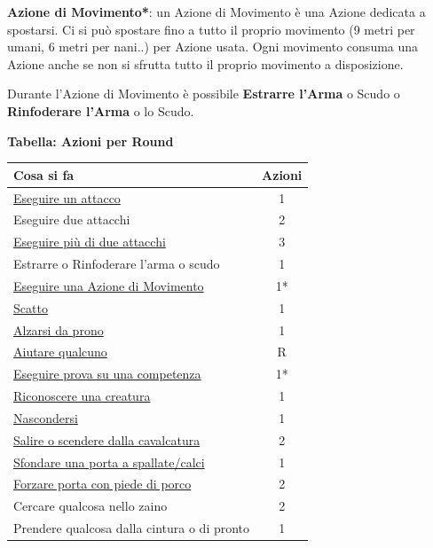 \begin{multicols}{2}
\textbf{Azione di Movimento*}: un Azione di Movimento è una Azione dedicata a spostarsi. Ci si può spostare fino a tutto il proprio movimento (9 metri per umani, 6 metri per nani..) per Azione usata. Ogni movimento consuma una Azione anche se non si sfrutta tutto il proprio movimento a disposizione.

Durante l'Azione di Movimento è possibile \textbf{Estrarre l'Arma} o Scudo o \textbf{Rinfoderare l'Arma} o lo Scudo.

\medskip

\textbf{Tabella: Azioni per Round}

\medskip

\noindent\begin{tabularx}{1\linewidth}{Xc}
	\toprule
\rowcolor{gray!20}\textbf{Cosa si fa} & \textbf{Azioni}\\
\toprule
\hyperlink{tiropercolpireedifesa}{Eseguire un attacco}& 1\\
\rowcolor{gray!20}Eseguire due attacchi& 2\\
\hyperlink{attacchimultiplimischia}{Eseguire più di due attacchi}& 3\\
\rowcolor{gray!20}Estrarre o Rinfoderare l'arma o scudo& 1\\
\midrule
\hyperlink{tipodimovimento}{Eseguire una Azione di Movimento} &1*\\
\rowcolor{gray!20}\hyperlink{azionediscatto}{Scatto} & 1\\
\hyperlink{alzarsidaprono}{Alzarsi da prono}& 1\\
\midrule
\rowcolor{gray!20}\hyperlink{aiutare}{Aiutare qualcuno}& R\\
\hyperlink{esempiprovecompetenze}{Eseguire prova su una competenza}& 1*\\
\rowcolor{gray!20}\hyperlink{riconosceremostro}{Riconoscere una creatura}& 1\\
\hyperlink{copertura}{Nascondersi}& 1\\
\midrule
\rowcolor{gray!20}\hyperlink{cavalcare}{Salire o scendere dalla cavalcatura}& 2\\
\hyperlink{sfondare}{Sfondare una porta a spallate/calci}& 1\\
\rowcolor{gray!20}\hyperlink{piedediporco}{Forzare porta con piede di porco}& 2\\
\midrule
Cercare qualcosa nello zaino& 2\\
\rowcolor{gray!20}Prendere qualcosa dalla cintura o di pronto & 1\\

\end{tabularx}
\end{multicols}
